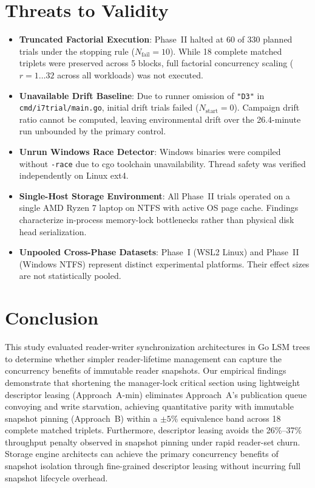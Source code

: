 \documentclass[conference]{IEEEtran}
\begin{document}
\section{Threats to Validity}
\begin{itemize}
    \item \textbf{Truncated Factorial Execution}: Phase~II halted at 60 of 330 planned trials under the stopping rule ($N_{\text{fail}} = 10$). While 18 complete matched triplets were preserved across 5 blocks, full factorial concurrency scaling ($r=1\dots 32$ across all workloads) was not executed.
    \item \textbf{Unavailable Drift Baseline}: Due to runner omission of \texttt{"D3"} in \texttt{cmd/i7trial/main.go}, initial drift trials failed ($N_{\text{start}} = 0$). Campaign drift ratio cannot be computed, leaving environmental drift over the 26.4-minute run unbounded by the primary control.
    \item \textbf{Unrun Windows Race Detector}: Windows binaries were compiled without \texttt{-race} due to cgo toolchain unavailability. Thread safety was verified independently on Linux ext4.
    \item \textbf{Single-Host Storage Environment}: All Phase~II trials operated on a single AMD Ryzen 7 laptop on NTFS with active OS page cache. Findings characterize in-process memory-lock bottlenecks rather than physical disk head serialization.
    \item \textbf{Unpooled Cross-Phase Datasets}: Phase~I (WSL2 Linux) and Phase~II (Windows NTFS) represent distinct experimental platforms. Their effect sizes are not statistically pooled.
\end{itemize}

\section{Conclusion}
This study evaluated reader-writer synchronization architectures in Go LSM trees to determine whether simpler reader-lifetime management can capture the concurrency benefits of immutable reader snapshots. Our empirical findings demonstrate that shortening the manager-lock critical section using lightweight descriptor leasing (Approach~A-min) eliminates Approach~A's publication queue convoying and write starvation, achieving quantitative parity with immutable snapshot pinning (Approach~B) within a $\pm 5\%$ equivalence band across 18 complete matched triplets. Furthermore, descriptor leasing avoids the 26\%--37\% throughput penalty observed in snapshot pinning under rapid reader-set churn. Storage engine architects can achieve the primary concurrency benefits of snapshot isolation through fine-grained descriptor leasing without incurring full snapshot lifecycle overhead.
\end{document}
